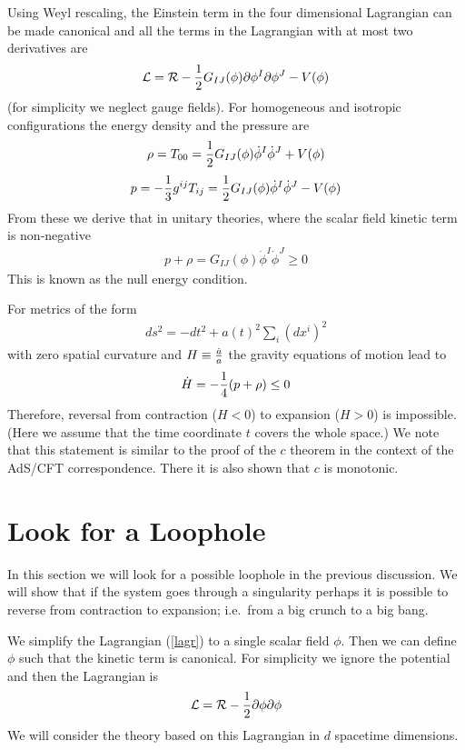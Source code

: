 \documentclass[a4paper,12pt,oneside]{article}
\begin{document}
Using Weyl rescaling, the Einstein term in the four dimensional
Lagrangian can be made canonical and all the terms in the
Lagrangian with at most two derivatives are
\begin{eqnarray}
{\cal L}={\cal R}-{1\over 2} G_{IJ}(\phi) \partial \phi^I\partial
\phi^J - V(\phi) \label{lagr}
\end{eqnarray}
(for simplicity we neglect gauge fields).  For homogeneous and
isotropic configurations the energy density and the pressure are
\begin{eqnarray}
  \rho=T_{00}= {1\over 2} G_{IJ}(\phi) \dot\phi^I\dot \phi^J +
  V(\phi)
\end{eqnarray}
\begin{eqnarray}
   p=-{1\over 3} g^{ij}T_{ij}= {1\over 2} G_{IJ}(\phi)
\dot\phi^I\dot \phi^J - V(\phi)   \label{rhop}
\end{eqnarray}
From these we derive that in unitary theories, where the scalar
field kinetic term is non-negative
\begin{eqnarray}
p+\rho = G_{IJ}(\phi) \dot\phi^I\dot \phi^J \ge 0
\end{eqnarray}
This is known as the null energy condition.

For metrics of the form
\begin{eqnarray}
ds^2=-dt^2+a(t)^2 \sum_i (dx^i)^2
\end{eqnarray}
with zero spatial curvature and $H \equiv {\dot a \over a} $ the
gravity equations of motion lead to
\begin{eqnarray}
\dot H = -{1\over 4} (p+\rho)\le 0
\end{eqnarray}
Therefore, reversal from contraction ($H<0$) to expansion ($H>0$)
is impossible.  (Here we assume that the time coordinate $t$
covers the whole space.) We note that this statement is similar
to the proof of the $c$ theorem in the context of the AdS/CFT
correspondence.  There it is also shown that $c$ is monotonic.

\setcounter{equation}{0}
\section{Look for a Loophole}

In this section we will look for a possible loophole in the
previous discussion.  We will show that if the system goes
through a singularity perhaps it is possible to reverse from
contraction to expansion; i.e.\ from a big crunch to a big bang.

We simplify the Lagrangian (\ref{lagr}) to a single scalar field
$\phi$.  Then we can define $\phi$ such that the kinetic term is
canonical.  For simplicity we ignore the potential and then the
Lagrangian is
\begin{eqnarray}
{\cal L}={\cal R}-{1\over 2} \partial \phi\partial \phi
\label{simlag}
\end{eqnarray}
We will consider the theory based on this Lagrangian in $d$
spacetime dimensions.
\end{document}
